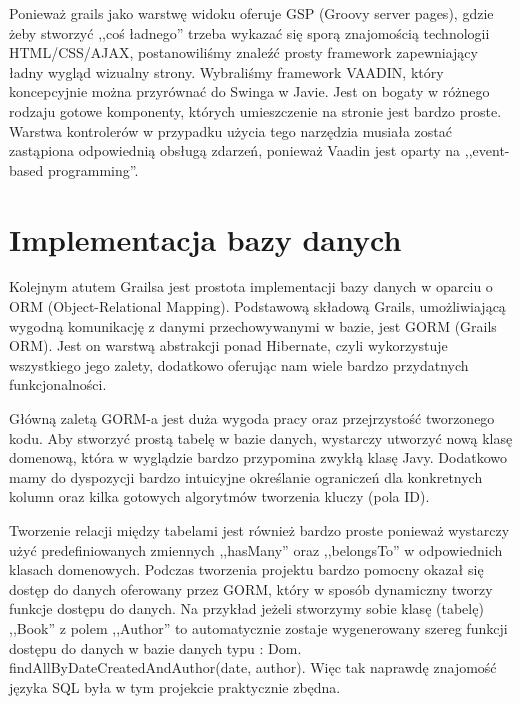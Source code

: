 \hspace{15pt}Ponieważ grails jako warstwę widoku oferuje GSP (Groovy server pages), gdzie żeby stworzyć ,,coś ładnego'' trzeba wykazać się sporą znajomością technologii HTML/CSS/AJAX, postanowiliśmy znaleźć prosty framework zapewniający ładny wygląd wizualny strony. Wybraliśmy framework VAADIN, który koncepcyjnie można przyrównać do Swinga w Javie. Jest on bogaty w różnego rodzaju gotowe komponenty, których umieszczenie na stronie jest bardzo proste. Warstwa kontrolerów w przypadku użycia tego narzędzia musiała zostać zastąpiona odpowiednią obsługą zdarzeń, ponieważ Vaadin jest oparty na ,,event-based programming''. 



\section{Implementacja bazy danych}
\label{sec:impldb}

\hspace{15pt}Kolejnym atutem Grailsa jest prostota implementacji bazy danych w oparciu o ORM (Object-Relational Mapping). Podstawową składową Grails, umożliwiającą wygodną komunikację z danymi przechowywanymi w bazie, jest GORM (Grails ORM). Jest on warstwą abstrakcji ponad Hibernate, czyli wykorzystuje wszystkiego jego zalety, dodatkowo oferując nam wiele bardzo przydatnych funkcjonalności. 

\hspace{15pt}Główną zaletą GORM-a jest duża wygoda pracy oraz przejrzystość tworzonego kodu. Aby stworzyć prostą tabelę w bazie danych, wystarczy utworzyć nową klasę domenową, która w wyglądzie bardzo przypomina zwykłą klasę Javy. Dodatkowo mamy do dyspozycji bardzo intuicyjne określanie ograniczeń dla konkretnych kolumn oraz kilka gotowych algorytmów tworzenia kluczy (pola ID). 

\hspace{15pt}Tworzenie relacji między tabelami jest również bardzo proste ponieważ wystarczy użyć predefiniowanych zmiennych ,,hasMany'' oraz ,,belongsTo'' w odpowiednich klasach domenowych. Podczas tworzenia projektu bardzo pomocny okazał się dostęp do danych oferowany przez GORM, który w sposób dynamiczny tworzy funkcje dostępu do danych. Na przykład jeżeli stworzymy sobie klasę (tabelę) ,,Book'' z polem ,,Author'' to automatycznie zostaje wygenerowany szereg funkcji dostępu do danych w bazie danych typu : Dom. findAllByDateCreatedAndAuthor(date, author). Więc tak naprawdę znajomość języka SQL była w tym projekcie praktycznie zbędna.

